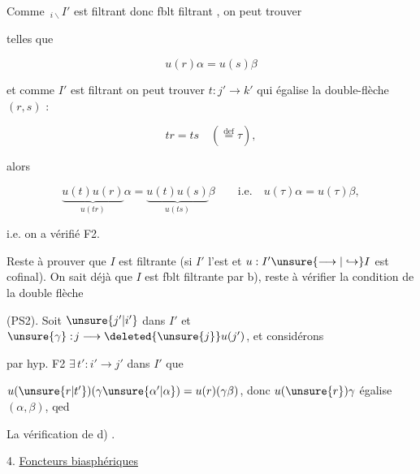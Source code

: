 Comme $\,{}_{i\backslash}I'$ est filtrant donc fblt filtrant , on peut trouver


telles que

\[
u(r)\alpha=u(s)\beta
\]

et comme $I'$ est filtrant on peut trouver $t:j'\longrightarrow k'$ qui égalise la double-flèche $(r,s)$ :

\[
tr=ts\quad(\overset{\mathrm{def}}{=}\tau),
\]

alors

\[
\underbrace{u(t)u(r)}_{u(tr)}\alpha=\underbrace{u(t)u(s)}_{u(ts)}\beta\qquad\text{i.e.}\quad u(\tau)\alpha=u(\tau)\beta,
\]

i.e. on a vérifié F2.

Reste à prouver que $I$ est filtrante (si $I'$ l'est et $u:I'\unsure{\longrightarrow|\hookrightarrow}I$ est cofinal). On sait déjà que $I$ est fblt filtrante par b), reste à vérifier la condition de la double flèche


(PS2). Soit $\unsure{j'|i'}$ dans $I'$ et $\unsure{\gamma}:\!j\longrightarrow\deleted{\unsure{j}}u(j')$,  et considérons


par hyp. F2 $\exists\,t':i'\longrightarrow j'$ dans $I'$  que

$u(\unsure{r|t'})(\gamma\unsure{\alpha'|\alpha})=u(r)(\gamma\beta)$, donc $u(\unsure{r})\gamma$ égalise $(\alpha,\beta)$, qed

La vérification de d)  .

4. \uline{Foncteurs biasphériques}

